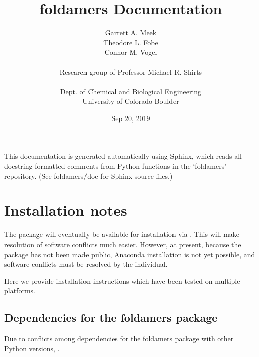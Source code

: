 \documentclass[letterpaper,12pt,english,openany,oneside]{sphinxmanual}
\title{foldamers Documentation}
\date{Sep 20, 2019}
\author{Garrett A. Meek\\Theodore L. Fobe\\Connor M. Vogel\\ \\Research group of Professor Michael R. Shirts\\ \\Dept. of Chemical and Biological Engineering\\University of Colorado Boulder}
\begin{document}
\pagestyle{empty}
\sphinxmaketitle
\pagestyle{plain}
\sphinxtableofcontents
\pagestyle{normal}
\label{\detokenize{index::doc}}


This documentation is generated automatically using Sphinx, which reads all docstring-formatted comments from Python functions in the ‘foldamers’ repository.  (See foldamers/doc for Sphinx source files.)


\chapter{Installation notes}
\label{\detokenize{install:installation-notes}}\label{\detokenize{install::doc}}
The  package will eventually be available for installation via .  This will make resolution of software conflicts much easier.  However, at present, because the package has not been made public, Anaconda installation is not yet possible, and software conflicts must be resolved by the individual.

Here we provide installation instructions which have been tested on multiple platforms.


\section{Dependencies for the foldamers package}
\label{\detokenize{install:dependencies-for-the-foldamers-package}}
Due to conflicts among dependencies for the foldamers package with other Python versions, .
\end{document}
